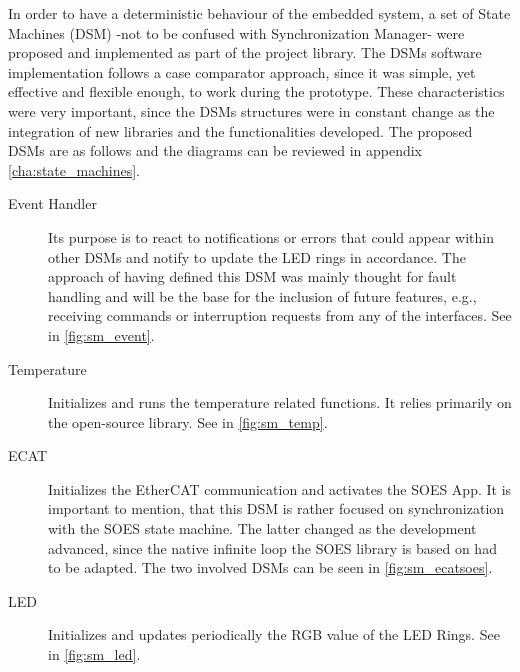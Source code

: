 In order to have a deterministic behaviour of the embedded system, a set of State Machines (DSM) -not to be confused with Synchronization Manager- were proposed 
and implemented as part of the project library. 
The DSMs software implementation follows a case comparator approach, since it was simple, yet effective and flexible enough, 
to work during the prototype. 
These characteristics were very important, since the DSMs structures were in constant change as the integration of new libraries 
and the functionalities developed. 
The proposed DSMs are as follows and the diagrams can be reviewed in appendix \ref{cha:state_machines}.

\begin{description}
\item[Event Handler] Its purpose is to react to notifications or errors that could appear within other DSMs and notify to update the LED rings in accordance.
                    The approach of having defined this DSM was mainly thought for fault handling and will be the base for the inclusion of future features, e.g.,
                    receiving commands or interruption requests from any of the interfaces. See in \ref{fig:sm_event}.
\item[Temperature] Initializes and runs the temperature related functions. It relies primarily on the open-source library. See in \ref{fig:sm_temp}.
\item[ECAT] Initializes the EtherCAT communication and activates the SOES App. It is important to mention, that this DSM is rather focused on synchronization 
            with the SOES state machine. The latter changed as the development advanced, since the native infinite loop the SOES library is based on had to be adapted.
            The two involved DSMs can be seen in \ref{fig:sm_ecatsoes}.
\item[LED] Initializes and updates periodically the RGB value of the LED Rings. See in \ref{fig:sm_led}.
\end{description}

